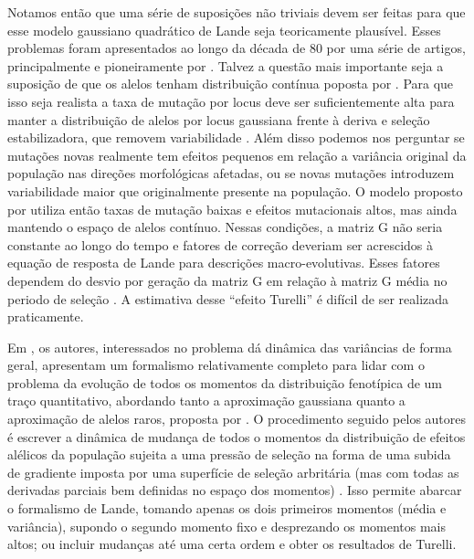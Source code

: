 \documentclass[a4paper, 12pt, titlepage, onecolumn]{article}
\numberwithin{equation}{section}
\numberwithin{table}{section}
\begin{document}
Notamos então que uma série de suposições não triviais devem ser feitas
para que esse modelo gaussiano quadrático de Lande seja teoricamente
plausível. Esses problemas foram apresentados ao longo da década de 80
por uma série de artigos, principalmente e pioneiramente por
\citep{Turelli1984, Turelli1985, Turelli1986, Barton1987}. Talvez a
questão mais importante seja a suposição de que os alelos tenham
distribuição contínua poposta por \cite{Crow1964}. Para que isso seja
realista a taxa de mutação por locus deve ser suficientemente alta para
manter a distribuição de alelos por locus gaussiana frente à deriva e
seleção estabilizadora, que removem variabilidade \citep{Falconer1996}.
Além disso podemos nos perguntar se mutações novas realmente tem efeitos
pequenos em relação a variância original da população nas direções
morfológicas afetadas, ou se novas mutações introduzem variabilidade
maior que originalmente presente na população. O modelo proposto por
\cite{Turelli1984} utiliza então taxas de mutação baixas e efeitos
mutacionais altos, mas ainda mantendo o espaço de alelos contínuo.
Nessas condições, a matriz G não seria constante ao longo do tempo e
fatores de correção deveriam ser acrescidos à equação de resposta de
Lande para descrições macro-evolutivas. Esses fatores dependem do desvio
por geração da matriz G em relação à matriz G média no periodo de
seleção \citep{Jones2003}. A estimativa desse ``efeito Turelli'' é
difícil de ser realizada praticamente.  

Em \cite{Barton1987}, os autores, interessados no problema dá dinâmica
das variâncias de forma geral, apresentam um formalismo relativamente
completo para lidar com o problema da evolução de todos os momentos da
distribuição fenotípica de um traço quantitativo, abordando tanto a
aproximação gaussiana quanto a aproximação de alelos raros, proposta por
\cite{Turelli1984}. O procedimento seguido pelos autores é escrever a
dinâmica de mudança de todos o momentos da distribuição de efeitos
alélicos da população sujeita a uma pressão de seleção na forma de uma
subida de gradiente imposta por uma superfície de seleção arbritária
(mas com todas as derivadas parciais bem definidas no espaço dos
momentos) \citep{Arnold2001a}. Isso permite abarcar o formalismo de
Lande, tomando apenas os dois primeiros momentos (média e variância),
supondo o segundo momento fixo e desprezando os momentos mais altos; ou
incluir mudanças até uma certa ordem e obter os resultados de Turelli. 

\end{document}
